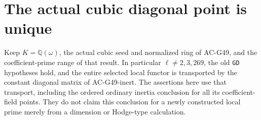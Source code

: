\section{The actual cubic diagonal point is unique}
\label{sec:cubic-fixed-point}

Keep $K=\mathbb Q(\omega)$, the actual cubic seed and
normalized ring of AC-G49, and the coefficient-prime
range of that result.  In particular $\ell\ne2,3,269$,
the old \texttt{GD} hypotheses hold, and the entire
selected local functor is transported by the constant
diagonal matrix of AC-G49-inert.
The assertions here use that transport, including
the ordered ordinary inertia conclusion for all its
coefficient-field points.  They do not claim this
conclusion for a newly constructed local prime merely
from a dimension or Hodge-type calculation.

